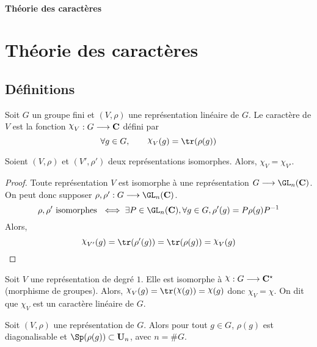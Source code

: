\ifsolo
    ~

    \vspace{1cm}

    \begin{center}
        \textbf{\LARGE Théorie des caractères} \\[1em]
    \end{center}
    \tableofcontents
\else
    \chapter{Théorie des caractères}

    \minitoc
\fi
\thispagestyle{empty}

\section{Définitions}

\begin{dfn}
    Soit $G$ un groupe fini et  $(V, \rho)$ une représentation linéaire de  $G$. Le caractère de  $V$ est la fonction  $\chi_V: G \longrightarrow  \C$ défini par \[
        \forall  g \in  G, \qquad  \chi_V(g)=\tr(\rho(g))
    \] 
\end{dfn}

\begin{prop}
    Soient $(V, \rho)$ et  $(V', \rho')$ deux représentations isomorphes. Alors,  $\chi_V=\chi_{V'}$.
\end{prop}

\begin{proof}
    Toute représentation $V$ est  isomorphe à une représentation $G \longrightarrow \GL_n(\C)$. On peut donc supposer $\rho, \rho': G \longrightarrow \GL_n(\C)$. 
    \[
        \rho, \rho' \text{ isomorphes } \iff \exists P \in  \GL_n(\C), \forall  g \in  G, \rho'(g)=P\rho(g)P^{-1}
    \]
    Alors, \[
        \chi_{V'}(g)=\tr(\rho'(g))=\tr(\rho(g))=\chi_V(g)
    \]
\end{proof}

\begin{ex}
    Soit $V$ une représentation de degré  $1$. Elle est isomorphe à  $\chi : G \longrightarrow \C^\star$ (morphisme de groupes). Alors, $\chi_V(g)=\tr(\chi(g))=\chi(g)$ donc  $\chi_V=\chi$. On dit que  $\chi_V$ est un caractère linéaire de  $G$.
\end{ex}

\begin{prop}
    Soit $(V, \rho)$ une représentation de  $G$. Alors pour tout  $g \in  G$, $\rho(g)$ est diagonalisable et  $\Sp(\rho(g))\subset \U_n$, avec $n=\#G$.
\end{prop}

